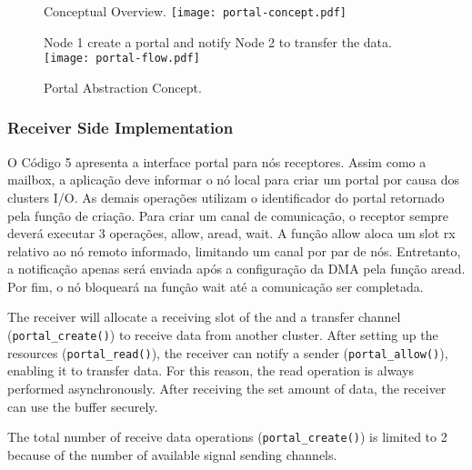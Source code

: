 			\begin{figure}[!tb]
				\centering%
				\caption{Portal Abstraction Concept.}%
				\label{fig:portal}%

					{Conceptual Overview.}%
					{\texttt{[image: portal-concept.pdf]}}%

				\hfill

					{Node 1 create a portal and notify Node 2 to transfer the data.}%
					{\texttt{[image: portal-flow.pdf]}}%

			\end{figure}

			\subsubsection{Receiver Side Implementation}

				O Código 5 apresenta a interface portal para nós receptores.
				Assim como a mailbox, a aplicação deve informar o nó local para criar um portal por causa dos clusters I/O.
				As demais operações utilizam o identificador do portal retornado pela função de criação.
				Para criar um canal de comunicação, o receptor sempre deverá executar 3 operações, allow, aread, wait.
				A função allow aloca um slot rx relativo ao nó remoto informado, limitando um canal por par de nós.
				Entretanto, a notificação apenas será enviada após a configuração da DMA pela função aread.
				Por fim, o nó bloqueará na função wait até a comunicação ser completada.

				


				The receiver will allocate a receiving slot of the \dnoc and a transfer
				channel (\texttt{portal\_create()}) to receive data from another cluster.
				After setting up the resources (\texttt{portal\_read()}), the receiver
				can notify a sender (\texttt{portal\_allow()}), enabling it to transfer data.
				For this reason, the read operation is always performed asynchronously.
				After receiving the set amount of data, the receiver can use the buffer securely.

				The total number of receive data operations (\texttt{portal\_create()})
				is limited to 2 because of the number of available signal sending channels.

